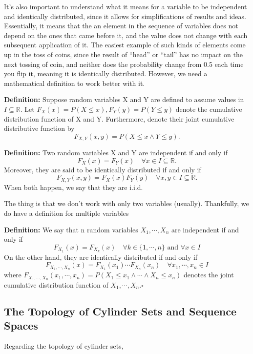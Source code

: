 \documentclass[a4paper]{article}
\theoremstyle{plain}
\theoremstyle{definition}
\begin{document}
  
   It's also important to understand what it means for a variable to be independent and identically distributed, since it allows 
 for simplifications of results and ideas. Essentially, it means that the an element in the sequence of variables  
 does not depend on the ones that came before it, and the value does not change with each subsequent application of it. 
 The easiest example of such kinds of elements come up in the toss of coins, since the result of ``head'' or ``tail'' 
 has no impact on the next tossing of coin, and neither does the probability change from 0.5 each time you flip it, 
 meaning it is identically distributed. However, we need a mathematical definition to work better with it. 

\textbf{Definition:}   Suppose random variables X and Y are defined to assume values in $I\subseteq{\mathbb{R}}$. Let $F_{X}(x) = P(X\leq{x}),  
 F_{Y}(y) = P(Y\leq{y})$ denote the cumulative distribution function of X and Y. Furthermore, denote their joint cumulative 
 distributive function by 
   $$ 
     F_{X, Y}(x, y) = P(X\leq{x}\wedge Y\leq{y}). 
   $$ 

\textbf{Definition:}    Two random variables X and Y are independent if and only if 
    $$ 
     F_{X}(x) = F_{Y}(x)\quad \forall x\in I\subseteq{\mathbb{R}}. 
    $$ 
    Moreover, they are said to be identically distributed if and only if  
    $$ 
     F_{X, Y}(x, y)=F_{X}(x)F_{Y}(y)\quad \forall x, y\in I\subseteq{\mathbb{R}}. 
    $$ 
    When both happen, we say that they are i.i.d. 

   The thing is that we don't work with only two variables (usually). Thankfully, we do have a definition for multiple variables 

  \textbf{Definition:}      We say that n random variables $X_{1},\cdots,X_{n}$ are independent if and only if  
    $$ 
    F_{X_{1}}(x) = F_{X_{k}}(x)\quad \forall k\in\{1,\cdots,n\}\text{ and }\forall x\in I 
    $$ 
    On the other hand, they are identically distributed if and only if  
    $$ 
     F_{X_{1},\cdots,X_{n}}(x) = F_{X_{1}}(x_{1})\cdots F_{X_{n}}(x_{n})\quad \forall x_{1},\cdots,x_{n}\in I 
    $$ 
  where $F_{X_{1},\cdots,X_{n}}(x_{1},\cdots,x_{n})=P(X_{1}\leq{x_{1}}\wedge\cdots\wedge X_{n}\leq{x_{n}})$ denotes the joint  
   cumulative distribution function of $X_{1},\cdots,X_{n}.\square$ 

  
 \subsection{The Topology of Cylinder Sets and Sequence Spaces} 
  Regarding the topology of cylinder sets,  
\end{document}
